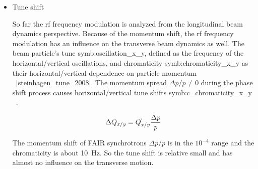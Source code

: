 \begin{itemize}
%
%


	\item Tune shift

So far the rf frequency modulation is analyzed from the longitudinal beam dynamics perspective. Because of the momentum shift, the rf frequency modulation has an influence on the transverse beam dynamics as well. The beam particle’s tune \gls{symb:oscillation_x_y}, defined as the frequency of the horizontal/vertical oscillations, and chromaticity \gls{symb:chromaticity_x_y} as their horizontal/vertical dependence on particle momentum ~\ref{steinhagen_tune_2008}. The momentum spread ${\Delta{p}}/{p} \neq 0$ during the phase shift process causes horizontal/vertical tune shifts \gls{symb:c_chromaticity_x_y} ~\cite{holzer_introduction_2013}.

\begin{equation}
\Delta{Q_{\mathit{x/y}}} = Q^`_{\mathit{x/y}}\frac{\Delta{p}}{p}
\label{eq:chromaticity_x}
\end{equation} 

The momentum shift of FAIR synchrotrons $\Delta p/p$ is in the $10^{-4}$ range and the chromaticity is about \SI{10}{Hz}. So the tune shift is relative small and has almost no influence on the transverse motion.

\end{itemize}

